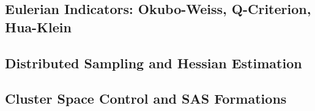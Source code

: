\documentclass[lettersize,journal]{IEEEtran}
\begin{document}

\subsection{Eulerian Indicators: Okubo-Weiss, Q-Criterion, Hua-Klein}


\subsection{Distributed Sampling and Hessian Estimation}


\subsection{Cluster Space Control and SAS Formations}

\end{document}
